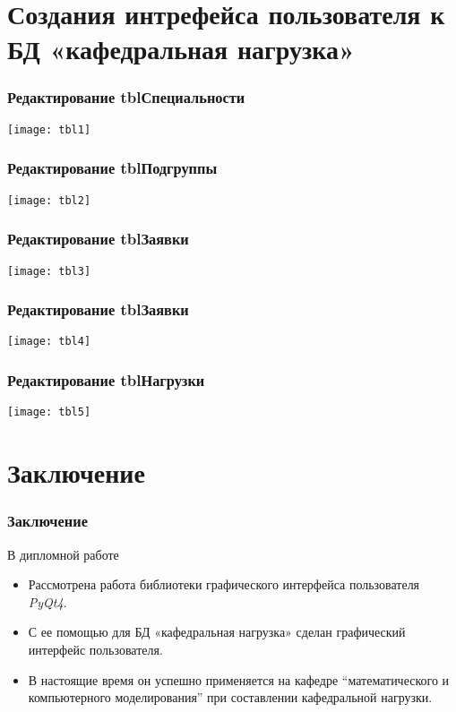 \documentclass[10pt,utf8,presentation,notheorems,xcolor=dvipsnames,compress]{beamer}
\begin{document}
\section{Создания интрефейса пользователя к БД «кафедральная нагрузка»}

\begin{frame}
\frametitle{Редактирование tblСпециальности}
\begin{center}
\texttt{[image: tbl1]}%
\end{center}
\end{frame}

\begin{frame}
\frametitle{Редактирование tblПодгруппы}
\begin{center}
\texttt{[image: tbl2]}%
\end{center}
\end{frame}

\begin{frame}
\frametitle{Редактирование tblЗаявки}
\begin{center}
\texttt{[image: tbl3]}%
\end{center}
\end{frame}

\begin{frame}
\frametitle{Редактирование tblЗаявки}
\begin{center}
\texttt{[image: tbl4]}%
\end{center}
\end{frame}

\begin{frame}
\frametitle{Редактирование tblНагрузки}
\begin{center}
\texttt{[image: tbl5]}%
\end{center}
\end{frame}

\section{Заключение}
\begin{frame}
\frametitle{Заключение}
\begin{block}{В дипломной работе}
\begin{itemize}
 \item Рассмотрена работа библиотеки графического интерфейса пользователя \emph{PyQt4}.
 \item С ее помощью для БД «кафедральная нагрузка» сделан графический интерфейс пользователя.
 \item В настоящие время он успешно применяется на кафедре
``математического и компьютерного моделирования'' при составлении
кафедральной нагрузки. 
\end{itemize}
\end{block}
\end{frame}
\end{document}
